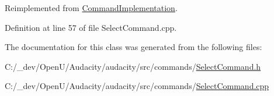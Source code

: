 Reimplemented from \hyperlink{class_command_implementation_a7b8787ad3b911316df9f097049a9eac3}{Command\+Implementation}.



Definition at line 57 of file Select\+Command.\+cpp.



The documentation for this class was generated from the following files\+:\begin{DoxyCompactItemize}
\item 
C\+:/\+\_\+dev/\+Open\+U/\+Audacity/audacity/src/commands/\hyperlink{_select_command_8h}{Select\+Command.\+h}\item 
C\+:/\+\_\+dev/\+Open\+U/\+Audacity/audacity/src/commands/\hyperlink{_select_command_8cpp}{Select\+Command.\+cpp}\end{DoxyCompactItemize}
